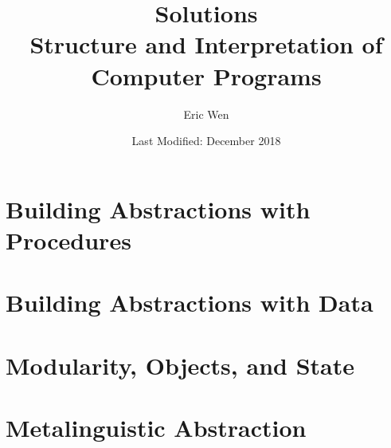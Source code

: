 \documentclass[a4paper]{report}
\begin{document}
\title{Solutions \\
\large Structure and Interpretation of Computer Programs}
\author{Eric Wen}
\date{Last Modified: December 2018}
\maketitle

\begin{multicols}{2}
  \tableofcontents
\end{multicols}

\def\codedir{./code}

%
%

\chapter{Building Abstractions with Procedures}



%
%

\chapter{Building Abstractions with Data}



%
%

\chapter{Modularity, Objects, and State}



%
%

\chapter{Metalinguistic Abstraction}


\end{document}
